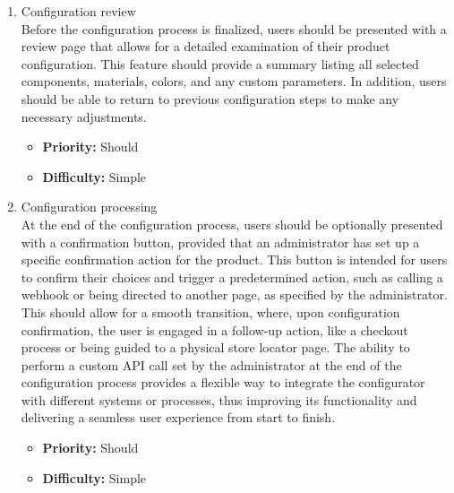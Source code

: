 \begin{enumerate}[label=\textbf{F\arabic*:}, leftmargin=*]
\item \label{itm:F9} Configuration review
\vspace{2pt}
\\Before the configuration process is finalized, users should be presented with a review page that allows for a detailed examination of their product configuration. This feature should provide a summary listing all selected components, materials, colors, and any custom parameters. In addition, users should be able to return to previous configuration steps to make any necessary adjustments.
\begin{itemize}[noitemsep, label=\trianglebullet]
    \item \textbf{Priority:} Should
    \item \textbf{Difficulty:} Simple
\end{itemize}
\vspace{4pt}

\item \label{itm:F10} Configuration processing
\vspace{2pt}
\\At the end of the configuration process, users should be optionally presented with a confirmation button, provided that an administrator has set up a specific confirmation action for the product. This button is intended for users to confirm their choices and trigger a predetermined action, such as calling a webhook or being directed to another page, as specified by the administrator. This should allow for a smooth transition, where, upon configuration confirmation, the user is engaged in a follow-up action, like a checkout process or being guided to a physical store locator page. The ability to perform a custom API call set by the administrator at the end of the configuration process provides a flexible way to integrate the configurator with different systems or processes, thus improving its functionality and delivering a seamless user experience from start to finish.
\begin{itemize}[noitemsep, label=\trianglebullet]
    \item \textbf{Priority:} Should
    \item \textbf{Difficulty:} Simple
\end{itemize}
\vspace{4pt}


\end{enumerate}
